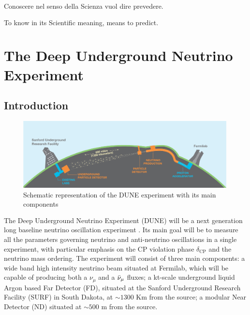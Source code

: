 \begin{savequote}[8cm]
Conoscere nel senso della Scienza vuol dire prevedere.

To know in its Scientific meaning, means to predict.
\end{savequote}

\chapter{\label{ch:3-DUNE}The Deep Underground Neutrino Experiment}


\minitoc
\section{Introduction} \label{ch3-Sec:Introduction}
\begin{figure}[!ht]
     \centering
     \includegraphics[width=0.99\textwidth]{figures/ch3-DUNE/LBNE_Graphic_061615_2016.jpg}
     \caption{Schematic representation of the DUNE experiment with its main components}
        \label{fig:DUNEdiagram}
\end{figure}
The Deep Underground Neutrino Experiment (DUNE) will be a next generation long baseline neutrino oscillation experiment \cite{DUNE:2020TDR1}. Its main goal will be to measure all the parameters governing neutrino and anti-neutrino oscillations in a single experiment, with particular emphasis on the CP violation phase $\delta_\textrm{CP}$ and the neutrino mass ordering. The experiment will consist of three main components: a wide band high intensity neutrino beam situated at Fermilab, which will be capable of producing both a $\nu_\mu$ and a $\Bar{\nu}_\mu$ fluxes; a kt-scale underground liquid Argon based Far Detector (FD), situated at the Sanford Underground Research Facility (SURF) in South Dakota, at $\sim1300$ Km from the source; a modular Near Detector (ND) situated at $\sim500$ m from the source.

